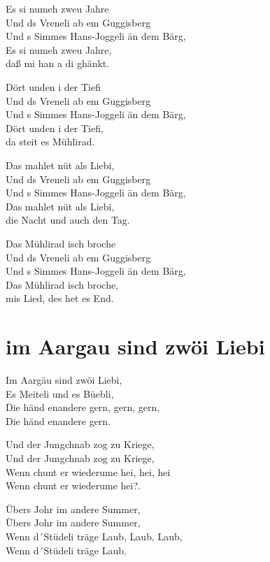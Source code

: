 \documentclass[
  letterpaper,
  twoside=false]{scrbook}
\begin{document}
Es si numeh zweu Jahre\\
Und ds Vreneli ab em Guggisberg\\
Und s Simmes Hans-Joggeli än dem Bärg,\\
Es si numeh zweu Jahre,\\
daß mi han a di ghänkt.

Dört unden i der Tiefi\\
Und ds Vreneli ab em Guggisberg\\
Und s Simmes Hans-Joggeli än dem Bärg,\\
Dört unden i der Tiefi,\\
da steit es Mühlirad.

Das mahlet nüt als Liebi,\\
Und ds Vreneli ab em Guggisberg\\
Und s Simmes Hans-Joggeli än dem Bärg,\\
Das mahlet nüt als Liebi,\\
die Nacht und auch den Tag.

Das Mühlirad isch broche\\
Und ds Vreneli ab em Guggisberg\\
Und s Simmes Hans-Joggeli än dem Bärg,\\
Das Mühlirad isch broche,\\
mis Lied, des het es End.

\hypertarget{im-aargau-sind-zwuxf6i-liebi}{%
\chapter{im Aargau sind zwöi Liebi}\label{im-aargau-sind-zwuxf6i-liebi}}

Im Aargäu sind zwöi Liebi,\\
Es Meiteli und es Büebli,\\
Die händ enandere gern, gern, gern,\\
Die händ enandere gern.

Und der Jungchnab zog zu Kriege,\\
Und der Jungchnab zog zu Kriege,\\
Wenn chunt er wiederume hei, hei, hei\\
Wenn chunt er wiederume hei?.

Übers Johr im andere Summer,\\
Übers Johr im andere Summer,\\
Wenn d´Stüdeli träge Laub, Laub, Laub,\\
Wenn d´Stüdeli träge Laub.
\end{document}
